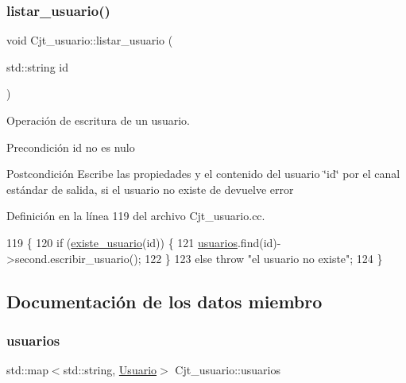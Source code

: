 \subsubsection{\texorpdfstring{listar\+\_\+usuario()}{listar\_usuario()}}
{\footnotesize\ttfamily void Cjt\+\_\+usuario\+::listar\+\_\+usuario (\begin{DoxyParamCaption}\item[{std\+::string}]{id }\end{DoxyParamCaption})}



Operación de escritura de un usuario. 

\begin{DoxyPrecond}{Precondición}
id no es nulo 
\end{DoxyPrecond}
\begin{DoxyPostcond}{Postcondición}
Escribe las propiedades y el contenido del usuario \char`\"{}id\char`\"{} por el canal estándar de salida, si el usuario no existe de devuelve error 
\end{DoxyPostcond}


Definición en la línea 119 del archivo Cjt\+\_\+usuario.\+cc.


\begin{DoxyCode}
119                                           \{
120     \textcolor{keywordflow}{if} (\mbox{\hyperlink{class_cjt__usuario_a2d4478e6b967659040f5a0b86b665204}{existe\_usuario}}(\textcolor{keywordtype}{id})) \{
121       \mbox{\hyperlink{class_cjt__usuario_af814d06f1c52bc2e744d253d20ce6e6b}{usuarios}}.find(\textcolor{keywordtype}{id})->second.escribir\_usuario();
122     \}
123     \textcolor{keywordflow}{else} \textcolor{keywordflow}{throw} \textcolor{stringliteral}{"el usuario no existe"};
124 \}
\end{DoxyCode}


\subsection{Documentación de los datos miembro}
\mbox{\label{class_cjt__usuario_af814d06f1c52bc2e744d253d20ce6e6b}} 
\subsubsection{\texorpdfstring{usuarios}{usuarios}}
{\footnotesize\ttfamily std\+::map$<$std\+::string, \mbox{\hyperlink{class_usuario}{Usuario}}$>$ Cjt\+\_\+usuario\+::usuarios\hspace{0.3cm}{\ttfamily [private]}}



